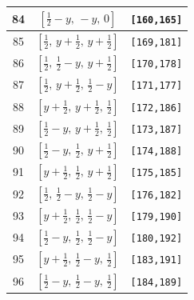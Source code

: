 \documentclass[fleqn,8pt]{jsarticle}
\begin{document}
\begin{longtable}{ccc}
84 & $\left[ \frac{1}{2} - y,\, - y,\, 0 \right]$ & {\tt [160,165]} \\ \hline
85 & $\left[ \frac{1}{2},\, y + \frac{1}{2},\, y + \frac{1}{2} \right]$ & {\tt [169,181]} \\ \hline
86 & $\left[ \frac{1}{2},\, \frac{1}{2} - y,\, y + \frac{1}{2} \right]$ & {\tt [170,178]} \\ \hline
87 & $\left[ \frac{1}{2},\, y + \frac{1}{2},\, \frac{1}{2} - y \right]$ & {\tt [171,177]} \\ \hline
88 & $\left[ y + \frac{1}{2},\, y + \frac{1}{2},\, \frac{1}{2} \right]$ & {\tt [172,186]} \\ \hline
89 & $\left[ \frac{1}{2} - y,\, y + \frac{1}{2},\, \frac{1}{2} \right]$ & {\tt [173,187]} \\ \hline
90 & $\left[ \frac{1}{2} - y,\, \frac{1}{2},\, y + \frac{1}{2} \right]$ & {\tt [174,188]} \\ \hline
91 & $\left[ y + \frac{1}{2},\, \frac{1}{2},\, y + \frac{1}{2} \right]$ & {\tt [175,185]} \\ \hline
92 & $\left[ \frac{1}{2},\, \frac{1}{2} - y,\, \frac{1}{2} - y \right]$ & {\tt [176,182]} \\ \hline
93 & $\left[ y + \frac{1}{2},\, \frac{1}{2},\, \frac{1}{2} - y \right]$ & {\tt [179,190]} \\ \hline
94 & $\left[ \frac{1}{2} - y,\, \frac{1}{2},\, \frac{1}{2} - y \right]$ & {\tt [180,192]} \\ \hline
95 & $\left[ y + \frac{1}{2},\, \frac{1}{2} - y,\, \frac{1}{2} \right]$ & {\tt [183,191]} \\ \hline
96 & $\left[ \frac{1}{2} - y,\, \frac{1}{2} - y,\, \frac{1}{2} \right]$ & {\tt [184,189]} \\
\end{longtable}
\renewcommand{\arraystretch}{1.2}
\end{document}
